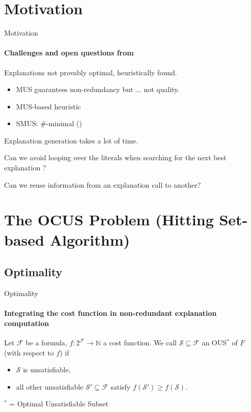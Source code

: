 \documentclass{beamer}
\newcommand\m[1]{\ensuremath{\mathcal{#1}}\xspace}
\renewcommand\emph[1]{{\color{vuborange}#1}}
\newcommand\nat{\m{\mathbb{N}}}
\newcommand\subsetT{\m{\mathcal{S}}}
\begin{document}
\section{Motivation}
	\begin{frame}{Motivation}
		\framesubtitle{Challenges and open questions from \cite{bogaerts2020step}}

		\begin{description}[font=\color{vuborange}\itshape]
			\small
			\item[Optimality] Explanations not provably optimal, \emph{heuristically} found.
			\begin{itemize}
				\item MUS guarantees non-redundancy but ... not quality.
				\item MUS-based heuristic
				\item SMUS: $\#$-minimal (\cite{ignatiev2015smallest})
			\end{itemize} \pause
			\item[Efficiency] Explanation generation takes a lot of time. \pause
			\item[Constrainedness] Can we avoid looping over the literals when searching for the next best explanation ?\pause
			\item[Incrementality] Can we reuse information from an explanation call to another? 
		\end{description}
	\end{frame}
\section{The OCUS Problem (Hitting Set-based Algorithm)}



\subsection{Optimality}
	\begin{frame}{Optimality}
	\framesubtitle{Integrating the cost function in non-redundant explanation computation}
	\begin{definition}
			\small
		Let $\m{F}$ be a formula, $f:2^{\m{F}} \to \nat$ a cost function. We call %
		$\mathcal{S} \subseteq \m{F}$ an \emph{OUS}$^*$ of $F$ (with respect to $f$) if \begin{itemize}                                      
			\item $\subsetT$ is unsatisfiable,
			\item all other unsatisfiable $\mathcal{S}'\subseteq \m{F}$ satisfy $f(\mathcal{S}')\geq f(\mathcal{S})$.
		\end{itemize}
	\end{definition}
	$^*$ = \emph{Optimal} Unsatisfiable Subset


		\end{frame}
	
\end{document}

